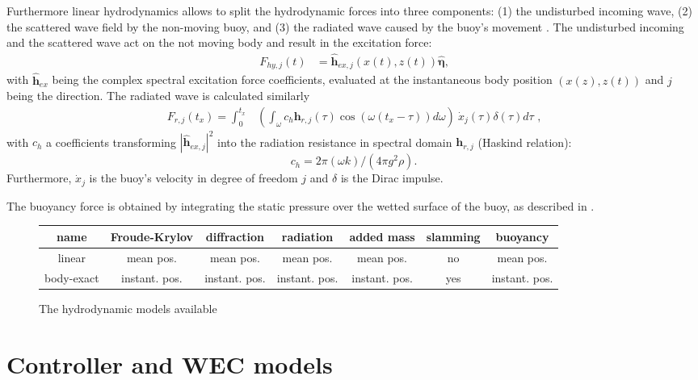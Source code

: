 \documentclass[oneside,10pt,a4paper]{book}
\begin{document}
Furthermore linear hydrodynamics allows to split the hydrodynamic forces into three components: (1) the undisturbed incoming wave, (2) the scattered wave field by the non-moving buoy, and (3) the radiated wave caused by the buoy's movement \cite{Falnes}.
The undisturbed incoming and the scattered wave act on the not moving body and result in the excitation force:
\begin{align}
	F_{hy,j}(t)&=\hat{\pmb{h}}_{ex,j}(x(t),z(t)) \hat{\pmb{\eta}}\label{eq:Fe}\text{,}
\end{align}
with $\hat{\pmb{h}}_{ex}$ being the complex spectral excitation force coefficients, evaluated at the instantaneous body position $(x(z),z(t))$ and $j$ being the direction.
The radiated wave is calculated similarly 
\begin{equation}\label{eq:cummings}
	\begin{split}
		F_{r,j}(t_x)=\int_{0}^{t_x}&\left(\int_{\omega} c_{h} \pmb{h}_{r,j}(\tau)\cos(\omega (t_x-\tau))d\omega\right)\:\dot{x}_j(\tau)\delta(\tau)d\tau\text{ ,}
	\end{split}
\end{equation}
with $c_h$ a coefficients transforming $|\hat{\pmb{h}}_{ex,j}|^2$ into the radiation resistance in spectral domain $\pmb{h}_{r,j}$ (Haskind relation):
\begin{equation}
	c_h=2\pi(\omega k)/(4\pi g^2 \rho)\text{.}\label{eq:Haskind3}
\end{equation}
Furthermore, $\dot{x}_{j}$ is the buoy's velocity in degree of freedom $j$ and $\delta$ is the Dirac impulse.

The buoyancy force is obtained by integrating the static pressure over the wetted surface of the buoy, as described in \cite{NL_FK}.
\begin{figure}[h!]\label{tab:hydrodynamic_features}
\begin{tabular}{c c c c c c c}
	name & Froude-Krylov & diffraction & radiation & added mass & slamming & buoyancy\\
	\hline
	linear&mean pos.& mean pos. & mean pos. & mean pos. & no & mean pos. \\
	body-exact&instant. pos.& instant. pos.& instant. pos. & instant. pos. & yes & instant. pos. 
\end{tabular}
\caption{The hydrodynamic models available}
\end{figure}

\chapter{Controller and WEC models}
\end{document}
